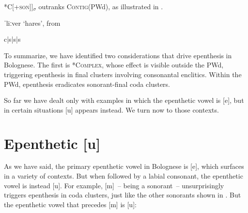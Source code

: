 \documentclass[output=paper,colorlinks,citecolor=brown]{langscibook}
\begin{document}
*C[+\textsc{son}]]$_\sigma$ outranks \textsc{Contig}(PWd), as illustrated in .


\begin{table}
\caption{ˈliːver `hares', from }
\label{haretableau}
\begin{center}
\ShadingOn
\begin{tableau}{c|s|s|s} 
      \const*{\textsc{*C[+son]]$_\sigma$}}    
               \vio{*!}     \vio{}  \vio{*}    \vio{}
    \vio{}      \vio{*}  \vio{}     \vio{*}
\end{tableau}
\end{center}
\end{table}


To summarize, we have identified two considerations that drive epenthesis in Bolognese.  The first is \textsc{*Complex}, whose effect is visible outside the PWd, triggering epenthesis in final clusters involving consonantal enclitics.  Within the PWd, epenthesis eradicates sonorant-final coda clusters.

So far we have dealt only with examples in which the epenthetic vowel is [e], but in certain situations [u] appears instead.  We turn now to those contexts.


\section{Epenthetic [u]}\label{epentheticu}

As we have said, the primary epenthetic vowel in Bolognese is [e], which surfaces in a variety of contexts.  But when followed by a labial consonant, the epenthetic vowel is instead [u].  For example, [m]~-- being a sonorant~-- unsurprisingly triggers epenthesis in coda clusters, just like the other sonorants shown in .  But the epenthetic vowel that precedes [m] is [u]:
\end{document}
